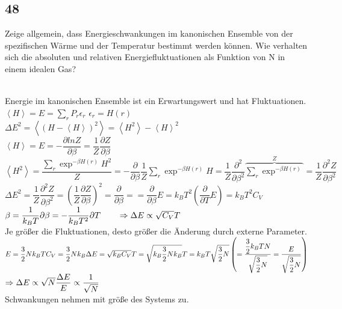 \documentclass[12pt,a4paper]{report}
\newenvironment{myfrag}{\begin{it}}{\end{it}\vspace{3mm}\par}
\numberwithin{equation}{section}
\begin{document}
\subsection{48}
\begin{myfrag}
Zeige allgemein, dass Energieschwankungen im kanonischen Ensemble von der
spezifischen Wärme und der Temperatur bestimmt werden können. Wie verhalten
sich die absoluten und relativen Energiefluktuationen als Funktion von N in einem
idealen Gas?
\end{myfrag} \quad \\
Energie im kanonischen Ensemble ist ein Erwartungswert und hat Fluktuationen. \\[1.5ex]
$ \left\langle H \right\rangle = E = \sum \limits _r P_r \epsilon _r$ \qquad $ \epsilon _r = H(r)$ 
\\[1ex]
$\Delta E^2 = \left\langle (H-\left\langle H\right\rangle )^2\right\rangle = \left\langle H^2\right\rangle -\left\langle H\right\rangle^2$
\\[1ex]
$ \left\langle H \right\rangle = E = -\dfrac{\partial ln Z}{\partial \beta } = \dfrac{1}{Z} \dfrac{\partial Z}{\partial \beta}$
\\[1ex]
$ \left\langle H^2 \right\rangle = \dfrac{\sum \limits_r \exp ^{-\beta H(r)}H^2}{Z} = - \dfrac{\partial }{\partial \beta} \dfrac{1}{Z} \sum \limits_r \exp ^{-\beta H(r)} H = \dfrac{1}{Z}\dfrac{\partial ^2}{\partial \beta ^2} \overbrace{\sum \limits _r \exp ^{-\beta H(r)}}^Z = \dfrac{1}{Z}\dfrac{\partial ^2 Z}{\partial \beta ^2}$
\\[1ex]
$\Delta E^2 = \dfrac{1}{Z} \dfrac{\partial ^2 Z}{\partial \beta ^2} = \left( \dfrac{1}{Z}\dfrac{\partial Z}{\partial \beta} \right)^2 = \dfrac{\partial }{\partial \beta}= = \dfrac{\partial}{\partial \beta}E=k_BT^2\left( \dfrac{\partial}{\partial T}E \right)= k_BT^2C_V$
\\[1ex]
$\beta = \dfrac{1}{k_BT} 
\\[1ex]
\partial \beta = - \dfrac{1}{k_BT^2}\partial T\qquad \Rightarrow \Delta E \propto \sqrt{C_V}T$ \\ Je größer die Fluktuationen, desto größer die Änderung durch externe Parameter.
\\[2ex]
$E=\dfrac{3}{2}Nk_BT \\[1ex]
C_V = \dfrac{3}{2} Nk_B \\[1ex]
\Delta E = \sqrt{k_BC_V}T= \sqrt{k_B\dfrac{3}{2}Nk_B}T=k_BT\sqrt{\dfrac{3}{2}N}\left( = \dfrac{\dfrac{3}{2}k_BTN}{\sqrt{\dfrac{3}{2}N}}=\dfrac{E}{\sqrt{\dfrac{3}{2}N}}\right)$ \\[1ex]
$\Rightarrow \Delta E \propto \sqrt{N}\\[1ex]
\dfrac{\Delta E}{E} \propto \dfrac{1}{\sqrt{N}}$\\Schwankungen nehmen mit größe des Systems zu.
\end{document}
